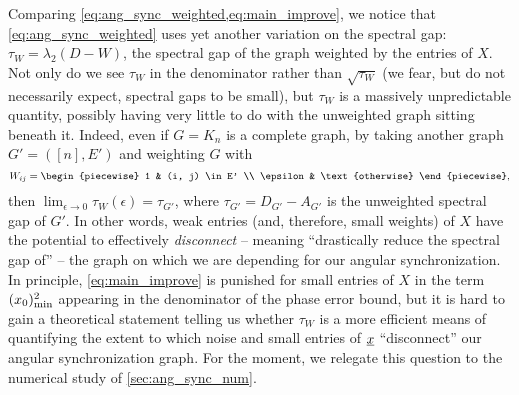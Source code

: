 Comparing \cref{eq:ang_sync_weighted,eq:main_improve}, we notice that \eqref{eq:ang_sync_weighted} uses yet another variation on the spectral gap: $\tau_W = \lambda_2(D - W)$, the spectral gap of the graph weighted by the entries of $X$.  Not only do we see $\tau_W$ in the denominator rather than $\sqrt{\tau_W}$ (we fear, but do not necessarily expect, spectral gaps to be small), but $\tau_W$ is a massively unpredictable quantity, possibly having very little to do with the unweighted graph sitting beneath it.  Indeed, even if $G = K_n$ is a complete graph, by taking another graph $G' = ([n], E')$ and weighting $G$ with \[W_{ij} = \begin{piecewise} 1 & (i, j) \in E' \\ \epsilon & \text{otherwise} \end{piecewise},\] then $\lim_{\epsilon \to 0} \tau_W(\epsilon) = \tau_{G'}$, where $\tau_{G'} = D_{G'} - A_{G'}$ is the unweighted spectral gap of $G'$.  In other words, weak entries (and, therefore, small weights) of $X$ have the potential to effectively \emph{disconnect} -- meaning ``drastically reduce the spectral gap of'' -- the graph on which we are depending for our angular synchronization.  In principle, \eqref{eq:main_improve} is punished for small entries of $X$ in the term $(x_0)_{\rm min}^2$ appearing in the denominator of the phase error bound, but it is hard to gain a theoretical statement telling us whether $\tau_W$ is a more efficient means of quantifying the extent to which noise and small entries of $\underline{x}$ ``disconnect'' our angular synchronization graph.  For the moment, we relegate this question to the numerical study of \cref{sec:ang_sync_num}.
